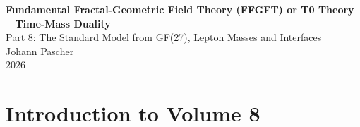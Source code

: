 



	
	\setcounter{section}{0}
	\setcounter{subsection}{0}
	\setcounter{subsubsection}{0}
	\setcounter{paragraph}{0}
	
	\setcounter{secnumdepth}{1}  %
	\makeatletter
	\renewcommand*\l@part[2]{%
		\ifnum \c@tocdepth >-2\relax
		\addpenalty{-\@highpenalty}%
		\addvspace{0.8em \@plus\p@}%
		{\leftskip 0em \relax
			\rightskip \@tocrmarg
			\parfillskip -\rightskip
			\parindent 0em \relax\@afterindenttrue
			\interlinepenalty\@M
			\leavevmode
			{\footnotesize\bfseries #1}\nobreak
			\leaders\hbox{$\m@th\mkern \@dotsep mu\hbox{}\mkern \@dotsep mu$}\hfill
			\nobreak\hb@xt@\@pnumwidth{\hss #2}\par}%
		\addvspace{0.2em \@plus\p@}%
		\nobreak
		\fi}
	\makeatother
	
	\renewcommand{\cftchapfont}{\footnotesize\bfseries}
	\renewcommand{\cftchappagefont}{\footnotesize\bfseries}
	\setlength{\cftbeforechapskip}{0.3em}
	
	\setcounter{tocdepth}{0}
	

	\begin{titlepage}
		\centering
		\vspace*{2cm}
	{\Huge\textbf{Fundamental Fractal-Geometric Field Theory (FFGFT) or T0 Theory – Time-Mass Duality}}\\[1cm]
	{\Large Part 8: The Standard Model from GF(27), Lepton Masses and Interfaces}\\[2cm]
		{\large Johann Pascher}\\[1cm]
		{\large 2026}
		\vfill
	\end{titlepage}

	\frontmatter
	\pagestyle{fancy}
	\makeatletter
	\let\ps@plain\ps@fancy
	\let\ps@empty\ps@fancy
	\makeatother

	\mainmatter
	\pagestyle{fancy}
	\tableofcontents

	\chapter{Introduction to Volume 8}
	

